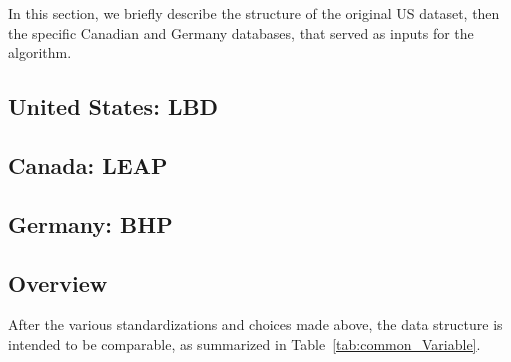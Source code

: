 
In this section, we briefly describe the structure of the original US dataset, then the specific Canadian and Germany databases, that served as inputs for the algorithm.

\subsection{United States: \acf{LBD}}



\subsection{Canada: \acf{LEAP}}



\subsection{Germany: \acf{BHP}}



\subsection{Overview}

After the various standardizations and choices made above, the data structure is intended to be comparable, as summarized in Table~\ref{tab:common_Variable}.

%

